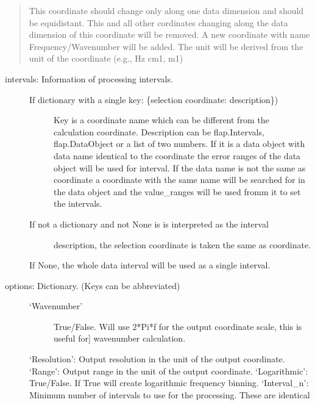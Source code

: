 \documentclass[letterpaper,10pt,english]{sphinxmanual}
\begin{document}
\begin{fulllineitems}
\begin{fulllineitems}
\begin{description}
\begin{quote}
This coordinate should change only along one data dimension and should be equidistant.
This and all other cordinates changing along the data dimension of
this coordinate will be removed. A new coordinate with name
Frequency/Wavenumber will be added. The unit will be
derived from the unit of the coordinate (e.g., Hz cm\sphinxhyphen{}1, m\sphinxhyphen{}1)
\end{quote}
\begin{description}
\item[{intervals: Information of processing intervals.}] \leavevmode\begin{description}
\item[{If dictionary with a single key: \{selection coordinate: description\})}] \leavevmode
Key is a coordinate name which can be different from the calculation
coordinate.
Description can be flap.Intervals, flap.DataObject or
a list of two numbers. If it is a data object with data name identical to
the coordinate the error ranges of the data object will be used for
interval. If the data name is not the same as coordinate a coordinate with the
same name will be searched for in the data object and the value\_ranges
will be used fromm it to set the intervals.

\item[{If not a dictionary and not None is is interpreted as the interval}] \leavevmode
description, the selection coordinate is taken the same as
coordinate.

\end{description}

If None, the whole data interval will be used as a single interval.

\item[{options: Dictionary. (Keys can be abbreviated)}] \leavevmode\begin{description}
\item[{‘Wavenumber’}] \leavevmode{[}True/False. Will use 2*Pi*f for the output coordinate scale, this is useful for{]}
wavenumber calculation.

\end{description}

‘Resolution’: Output resolution in the unit of the output coordinate.
‘Range’: Output range in the unit of the output coordinate.
‘Logarithmic’: True/False. If True will create logarithmic frequency binning.
‘Interval\_n’: Minimum number of intervals to use for the processing. These are identical
\begin{quote}


\end{quote}
\end{description}
\end{description}
\end{fulllineitems}
\end{fulllineitems}
\end{document}
